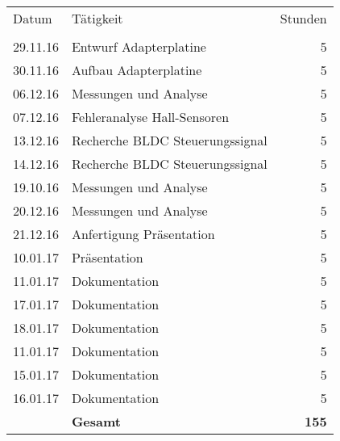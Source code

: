\begin{minipage}{0.5\textwidth}
    \begin{tabular}{lp{4.5cm}r}
		Datum		&	Tätigkeit				&Stunden	\\
					&							&			\\
		29.11.16	&	Entwurf Adapterplatine	&	5		\\
		30.11.16	&	Aufbau Adapterplatine	&	5		\\
		06.12.16	&	Messungen und Analyse	&	5		\\
		07.12.16	&	Fehleranalyse \newline
						Hall-Sensoren			&	5		\\
		13.12.16	&	Recherche BLDC \newline
						Steuerungssignal		&	5		\\
		14.12.16	&	Recherche BLDC \newline
						Steuerungssignal		&	5		\\
		19.10.16	&	Messungen und Analyse	&	5		\\
		20.12.16	&	Messungen und Analyse	&	5		\\
		21.12.16	&	Anfertigung Präsentation	&	5	\\
		10.01.17	&	Präsentation	&	5	\\
		11.01.17	&	Dokumentation	&	5	\\
		17.01.17	&	Dokumentation	&	5	\\
		18.01.17	&	Dokumentation	&	5	\\
		11.01.17	&	Dokumentation	&	5	\\
		15.01.17	&	Dokumentation	&	5	\\
		16.01.17	&	Dokumentation	&	5	\\
			        &	\textbf{Gesamt}	&	\textbf{155}
    \end{tabular}
\end{minipage}